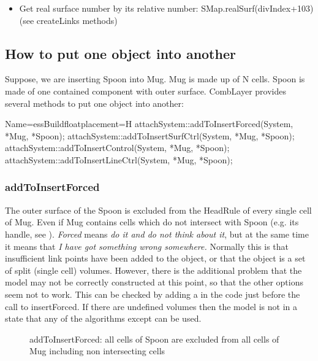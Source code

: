 \begin{itemize}
\item Get real surface number by its relative number: SMap.realSurf(divIndex+103) (see createLinks methods)
\end{itemize}

\subsection{How to put one object into another}

Suppose, we are inserting Spoon into Mug.
Mug is made up of N cells. Spoon is made of one contained component with outer surface.
CombLayer provides several methods to put one object into another:

\begin{cpp}{Name=essBuild}{floatplacement=H}
attachSystem::addToInsertForced(System,   *Mug, *Spoon);
attachSystem::addToInsertSurfCtrl(System, *Mug, *Spoon);
attachSystem::addToInsertControl(System,  *Mug, *Spoon);
attachSystem::addToInsertLineCtrl(System, *Mug, *Spoon);
\end{cpp}

\subsubsection{addToInsertForced}

The outer surface of the Spoon is excluded from the HeadRule of every single cell of Mug.
Even if Mug contains cells which do not intersect with Spoon (e.g. its handle, see ).
{\it Forced} means {\it do it and do not think about it}, but at the same time it means that
{\it I have got something wrong somewhere.}  Normally this is that insufficient link points have been added
to the object, or that the object is a set of split (single cell) volumes.  However, there is the additional
problem that the model may not be correctly constructed at this point, so that the other options seem not to work.
This can be checked by adding a
in the code just before the call to insertForced. If there are undefined volumes then the model is not in a state that
any of the  algorithms except  can be used. 

\begin{figure}
  \centering
  \caption{addToInsertForced: all cells of Spoon are excluded from all cells of Mug including non intersecting cells}
  \label{fig:forced}
\end{figure}


